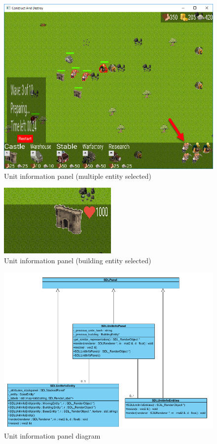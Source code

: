 \begin{figure}
    \centering
    \includegraphics[scale=0.6]{res/unitinfopanel-multiple-entity.png}
    \caption{Unit information panel (multiple entity selected)}\label{fig:unitinfopanelmultipleentity}
\end{figure}

\begin{figure}
    \centering
    \includegraphics[scale=0.8]{res/unitinfopanel-building-entity.png}
    \caption{Unit information panel (building entity selected)}\label{fig:unitinfopanelbuildingentity}
\end{figure}

\begin{figure}
    \centering
    \includegraphics[scale=0.7]{res/unitinfopanel-diagram.png}
    \caption{Unit information panel diagram}\label{fig:unitinfopaneldiagram}
\end{figure}
